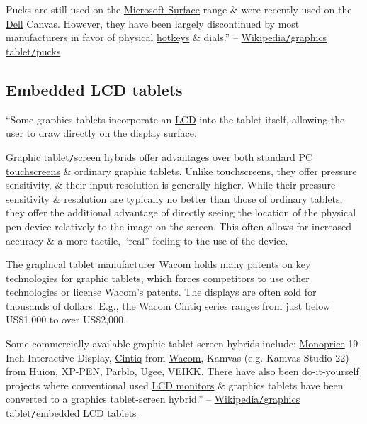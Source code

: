 \documentclass[oneside]{book}
\numberwithin{equation}{section}
\begin{document}
Pucks are still used on the \href{https://en.wikipedia.org/wiki/Microsoft_Surface}{Microsoft Surface} range \& were recently used on the \href{https://en.wikipedia.org/wiki/Dell}{Dell} Canvas. However, they have been largely discontinued by most manufacturers in favor of physical \href{https://en.wikipedia.org/wiki/Keyboard_shortcut}{hotkeys} \& dials.'' -- \href{https://en.wikipedia.org/wiki/Graphics_tablet#Pucks}{Wikipedia\texttt{/}graphics tablet\texttt{/}pucks}

\subsection{Embedded LCD tablets}
``Some graphics tablets incorporate an \href{https://en.wikipedia.org/wiki/LCD}{LCD} into the tablet itself, allowing the user to draw directly on the display surface.

Graphic tablet\texttt{/}screen hybrids offer advantages over both standard PC \href{https://en.wikipedia.org/wiki/Touchscreen}{touchscreens} \& ordinary graphic tablets. Unlike touchscreens, they offer pressure sensitivity, \& their input resolution is generally higher. While their pressure sensitivity \& resolution are typically no better than those of ordinary tablets, they offer the additional advantage of directly seeing the location of the physical pen device relatively to the image on the screen. This often allows for increased accuracy \& a more tactile, ``real'' feeling to the use of the device.

The graphical tablet manufacturer \href{https://en.wikipedia.org/wiki/Wacom_(company)}{Wacom} holds many \href{https://en.wikipedia.org/wiki/Patents}{patents} on key technologies for graphic tablets, which forces competitors to use other technologies or license Wacom's patents. The displays are often sold for thousands of dollars. E.g., the \href{https://en.wikipedia.org/wiki/Wacom_Cintiq}{Wacom Cintiq} series ranges from just below US\$1,000 to over US\$2,000.

Some commercially available graphic tablet-screen hybrids include: \href{https://en.wikipedia.org/wiki/Monoprice}{Monoprice} 19-Inch Interactive Display, \href{https://en.wikipedia.org/wiki/Cintiq}{Cintiq} from \href{https://en.wikipedia.org/wiki/Wacom_(company)}{Wacom}, Kamvas (e.g. Kamvas Studio 22) from \href{https://en.wikipedia.org/wiki/Huion}{Huion}, \href{https://en.wikipedia.org/wiki/XP-PEN}{XP-PEN}, Parblo, Ugee, VEIKK. There have also been \href{https://en.wikipedia.org/wiki/Do-it-yourself}{do-it-yourself} projects where conventional used \href{https://en.wikipedia.org/wiki/LCD_monitor}{LCD monitors} \& graphics tablets have been converted to a graphics tablet-screen hybrid.'' -- \href{https://en.wikipedia.org/wiki/Graphics_tablet#Embedded_LCD_tablets}{Wikipedia\texttt{/}graphics tablet\texttt{/}embedded LCD tablets}
\end{document}
